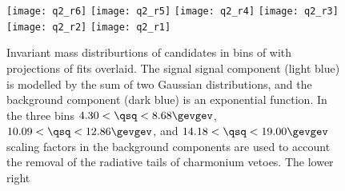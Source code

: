 \begin{figure}
  \begin{center}
    \texttt{[image: q2\_r6]}
    \texttt{[image: q2\_r5]}
    \texttt{[image: q2\_r4]}
    \texttt{[image: q2\_r3]}
    \texttt{[image: q2\_r2]}
    \texttt{[image: q2\_r1]}
    \caption{\small
      Invariant mass distriburtions of \btokpipimumu candidates in bins of \qsq with projections of
      fits overlaid.
      The signal signal component (light blue) is modelled by the sum of two Gaussian
      distributions, and the background component (dark blue) is an exponential function.
      In the three \qsq bins $4.30<\qsq<8.68\gevgev$, $10.09<\qsq<12.86\gevgev$, and
      $14.18<\qsq<19.00\gevgev$ scaling factors in the background components are used to account
      the removal of the radiative tails of charmonium vetoes.
      The lower right
    }
    \label{}
  \end{center}
\end{figure}






